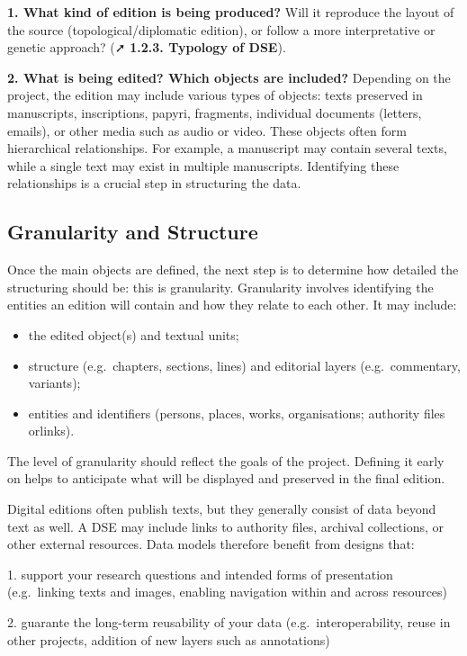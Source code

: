 \documentclass[
  letterpaper,
  DIV=11,
  numbers=noendperiod]{scrreprt}
\begin{document}
\textbf{1. What kind of edition is being produced?} Will it reproduce
the layout of the source (topological/diplomatic edition), or follow a
more interpretative or genetic approach? (➚ \textbf{1.2.3. Typology of
DSE}).

\textbf{2. What is being edited? Which objects are included?} Depending
on the project, the edition may include various types of objects: texts
preserved in manuscripts, inscriptions, papyri, fragments, individual
documents (letters, emails), or other media such as audio or video.
These objects often form hierarchical relationships. For example, a
manuscript may contain several texts, while a single text may exist in
multiple manuscripts. Identifying these relationships is a crucial step
in structuring the data.

\subsection{Granularity and Structure}\label{granularity-and-structure}

Once the main objects are defined, the next step is to determine how
detailed the structuring should be: this is granularity. Granularity
involves identifying the entities an edition will contain and how they
relate to each other. It may include:

\begin{itemize}
\item
  the edited object(s) and textual units;
\item
  structure (e.g.~chapters, sections, lines) and editorial layers
  (e.g.~commentary, variants);
\item
  entities and identifiers (persons, places, works, organisations;
  authority files orlinks).
\end{itemize}

The level of granularity should reflect the goals of the project.
Defining it early on helps to anticipate what will be displayed and
preserved in the final edition.

Digital editions often publish texts, but they generally consist of data
beyond text as well. A DSE may include links to authority files,
archival collections, or other external resources. Data models therefore
benefit from designs that:

1. support your research questions and intended forms of presentation
(e.g.~linking texts and images, enabling navigation within and across
resources)

2. guarante the long-term reusability of your data
(e.g.~interoperability, reuse in other projects, addition of new layers
such as annotations)
\end{document}
